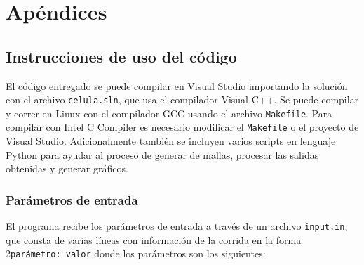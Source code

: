
\chapter{Apéndices} \label{chap:uso}

\section*{Instrucciones de uso del código}

El código entregado se puede compilar en Visual Studio importando la solución con el archivo \texttt{celula.sln}, que usa el compilador Visual C++. Se puede compilar y correr en Linux con el compilador GCC usando el archivo \texttt{Makefile}. Para compilar con Intel C Compiler es necesario modificar el \texttt{Makefile} o el proyecto de Visual Studio. Adicionalmente también se incluyen varios scripts en lenguaje Python para ayudar al proceso de generar de mallas, procesar las salidas obtenidas y generar gráficos.

\subsection*{Parámetros de entrada}

El programa recibe los parámetros de entrada a través de un archivo \texttt{input.in}, que consta de varias líneas con información de la corrida en la forma 2\texttt{parámetro: valor} donde los parámetros son los siguientes:

